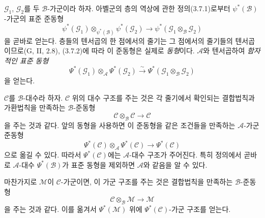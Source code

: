 \begin{env}[4.3.3]
\label{0.4.3.3-ko}
$\mathcal G_1$, $\mathcal G_2$를 두 $\mathcal B$-가군이라 하자.
아벨군의 층의 역상에 관한 정의(3.7.1)로부터
$\psi^*(\mathcal B)$-가군의 표준 준동형
\[
  \psi^*(\mathcal G_1)
  \otimes_{\psi^*(\mathcal B)}\psi^*(\mathcal G_2)
  \longrightarrow
  \psi^*(\mathcal G_1\otimes_{\mathcal B}\mathcal G_2)
\]
을 곧바로 얻는다. 층들의 텐서곱의 한 점에서의 줄기는 그 점에서의
줄기들의 텐서곱이므로(G, II, 2.8), (3.7.2)에 따라 이 준동형은
실제로 \emph{동형}이다. $\mathcal A$와 텐서곱하여
\emph{함자적인 표준 동형}
\[
  \Psi^*(\mathcal G_1)\otimes_{\mathcal A}\Psi^*(\mathcal G_2)
  \xrightarrow{\sim}
  \Psi^*(\mathcal G_1\otimes_{\mathcal B}\mathcal G_2)
  \tag{4.3.3.1}\label{0.4.3.3.1-ko}
\]
을 얻는다.
\end{env}

\begin{env}[4.3.4]
\label{0.4.3.4-ko}
$\mathcal C$를 $\mathcal B$-대수라 하자. $\mathcal C$ 위의 대수 구조를
주는 것은 각 줄기에서 확인되는 결합법칙과 가환법칙을 만족하는
$\mathcal B$-준동형
\[
  \mathcal C\otimes_{\mathcal B}\mathcal C
  \longrightarrow\mathcal C
\]
을 주는 것과 같다. 앞의 동형을 사용하면 이 준동형을 같은 조건들을
만족하는 $\mathcal A$-가군 준동형
\[
  \Psi^*(\mathcal C)\otimes_{\mathcal A}\Psi^*(\mathcal C)
  \longrightarrow\Psi^*(\mathcal C)
\]
으로 옮길 수 있다. 따라서 $\Psi^*(\mathcal C)$에는
$\mathcal A$-대수 구조가 주어진다. 특히 정의에서 곧바로
$\mathcal A$-대수 $\Psi^*(\mathcal B)$가 표준 동형을 제외하면
$\mathcal A$와 같음을 알 수 있다.

마찬가지로 $\mathcal M$이 $\mathcal C$-가군이면, 이 가군 구조를
주는 것은
결합법칙을 만족하는 $\mathcal B$-준동형
\[
  \mathcal C\otimes_{\mathcal B}\mathcal M
  \longrightarrow\mathcal M
\]
을 주는 것과 같다. 이를 옮겨서 $\Psi^*(\mathcal M)$ 위에
$\Psi^*(\mathcal C)$-가군 구조를 얻는다.
\end{env}

